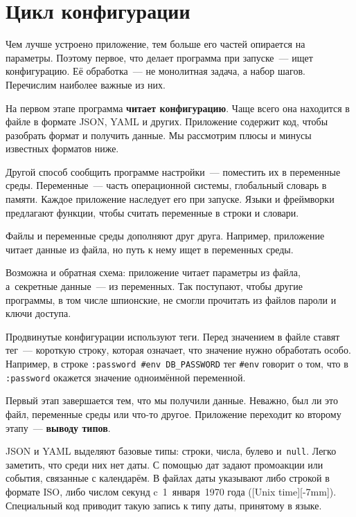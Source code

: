 \section{Цикл конфигурации}

Чем лучше устроено приложение, тем больше его частей опирается на параметры.
Поэтому первое, что делает программа при запуске~--- ищет конфигурацию. Её
обработка~--- не монолитная задача, а набор шагов. Перечислим наиболее важные из
них.

На первом этапе программа \textbf{читает конфигурацию}. Чаще всего она находится
в файле в формате JSON, YAML и других. Приложение содержит код, чтобы разобрать
формат и получить данные. Мы рассмотрим плюсы и минусы известных форматов ниже.

Другой способ сообщить программе настройки~--- поместить их в переменные среды.
Переменные~--- часть операционной системы, глобальный словарь в памяти. Каждое
приложение наследует его при запуске. Языки и фреймворки предлагают функции,
чтобы считать переменные в строки и словари.

Файлы и переменные среды дополняют друг друга. Например, приложение читает
данные из файла, но путь к нему ищет в переменных среды.

Возможна и обратная схема: приложение читает параметры из файла, а~секретные
данные~--- из переменных. Так поступают, чтобы другие программы, в том числе
шпионские, не смогли прочитать из файлов пароли и ключи доступа.


Продвинутые конфигурации используют теги. Перед значением в файле ставят тег~---
короткую строку, которая означает, что значение нужно обработать особо.
Например, в строке \verb|:password #env DB_PASSWORD| тег \verb|#env| говорит о
том, что в \verb|:password| окажется значение одноимённой переменной.

Первый этап завершается тем, что мы получили данные. Неважно, был ли это файл,
переменные среды или что-то другое. Приложение переходит ко второму этапу~---
\textbf{выводу типов}.


JSON и YAML выделяют базовые типы: строки, числа, булево и~\verb|null|. Легко
заметить, что среди них нет даты. С помощью дат задают промоакции или события,
связанные с календарём. В файлах даты указывают либо строкой в формате ISO, либо
числом секунд c~1~января~1970 года ([Unix time][-7mm]).
Специальный код приводит такую запись к типу даты, принятому в языке.

